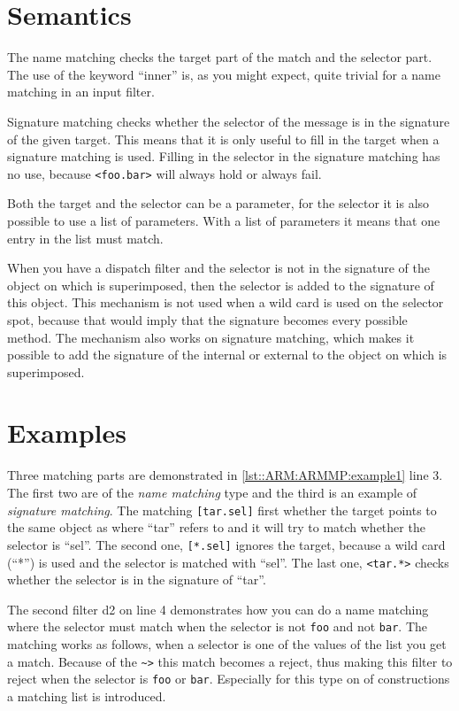 \section{Semantics}
The name matching checks the target part of the match and the selector part. 
The use of the keyword ``inner'' is, as you might expect, quite trivial for a name matching in an input filter.

Signature matching checks whether the selector of the message is in the signature of the given target. 
This means that it is only useful to fill in the target when a signature matching is used.
Filling in the selector in the signature matching has no use, because \lstinline|<foo.bar>| will always hold or always fail.

Both the target and the selector can be a parameter, for the selector it is also possible to use a list of parameters.
With a list of parameters it means that one entry in the list must match.

When you have a dispatch filter and the selector is not in the signature of the object on which is superimposed, then the selector is added to the signature of this object. 
This mechanism is not used when a wild card is used on the selector spot, because that would imply that the signature becomes every possible method. The mechanism also works on signature matching, which makes it possible to add the signature of the internal or external to the object on which is superimposed.

\section{Examples}
Three matching parts are demonstrated in \autoref{lst::ARM:ARMMP:example1} line 3. The first two
are of the \emph{name matching} type and the third is an example of \emph{signature matching}.
The matching \lstinline|[tar.sel]| first whether the target points to the same object as where ``tar'' refers to and it will try to match whether the selector is ``sel''. 
The second one, \lstinline|[*.sel]| ignores the target, because a wild card (``*'') is used and the selector is matched with ``sel''. 
The last one, \lstinline|<tar.*>| checks whether the selector is in the signature of ``tar''.

The second filter d2 on line 4 demonstrates how you can do a name matching where the selector must match when the selector is not \lstinline!foo! and not \lstinline!bar!.
The matching works as follows, when a selector is one of the values of the list you get a match. 
Because of the \lstinline[language=Composestar]|~>| this match becomes a reject, thus making this filter to reject when the selector is \lstinline!foo! or \lstinline!bar!.
Especially for this type on of constructions a matching list is introduced.

